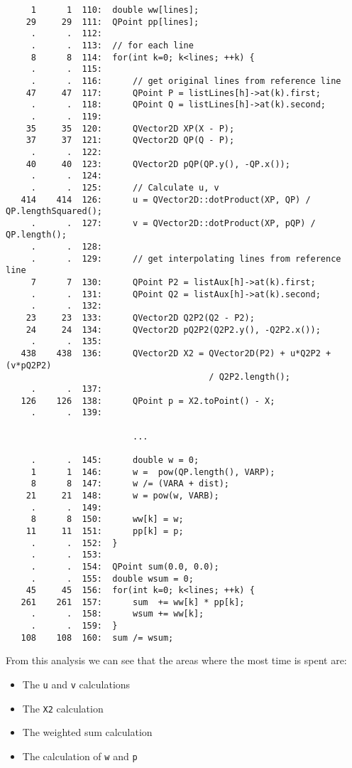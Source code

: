 \documentclass[12pt]{article}
\begin{document}
\begin{lstlisting}
     1      1  110:  double ww[lines];
    29     29  111:  QPoint pp[lines];
     .      .  112:
     .      .  113:  // for each line
     8      8  114:  for(int k=0; k<lines; ++k) {
     .      .  115:
     .      .  116:      // get original lines from reference line
    47     47  117:      QPoint P = listLines[h]->at(k).first;
     .      .  118:      QPoint Q = listLines[h]->at(k).second;
     .      .  119:
    35     35  120:      QVector2D XP(X - P);
    37     37  121:      QVector2D QP(Q - P);
     .      .  122:
    40     40  123:      QVector2D pQP(QP.y(), -QP.x());
     .      .  124:
     .      .  125:      // Calculate u, v
   414    414  126:      u = QVector2D::dotProduct(XP, QP) /  QP.lengthSquared();
     .      .  127:      v = QVector2D::dotProduct(XP, pQP) / QP.length();
     .      .  128:
     .      .  129:      // get interpolating lines from reference line
     7      7  130:      QPoint P2 = listAux[h]->at(k).first;
     .      .  131:      QPoint Q2 = listAux[h]->at(k).second;
     .      .  132:
    23     23  133:      QVector2D Q2P2(Q2 - P2);
    24     24  134:      QVector2D pQ2P2(Q2P2.y(), -Q2P2.x());
     .      .  135:
   438    438  136:      QVector2D X2 = QVector2D(P2) + u*Q2P2 + (v*pQ2P2)
                                        / Q2P2.length();
     .      .  137:
   126    126  138:      QPoint p = X2.toPoint() - X;
     .      .  139:

                         ...

     .      .  145:      double w = 0;
     1      1  146:      w =  pow(QP.length(), VARP);
     8      8  147:      w /= (VARA + dist);
    21     21  148:      w = pow(w, VARB);
     .      .  149:
     8      8  150:      ww[k] = w;
    11     11  151:      pp[k] = p;
     .      .  152:  }
     .      .  153:
     .      .  154:  QPoint sum(0.0, 0.0);
     .      .  155:  double wsum = 0;
    45     45  156:  for(int k=0; k<lines; ++k) {
   261    261  157:      sum  += ww[k] * pp[k];
     .      .  158:      wsum += ww[k];
     .      .  159:  }
   108    108  160:  sum /= wsum;
\end{lstlisting}

From this analysis we can see that the areas where the most time is spent are:


\begin{itemize}
  \item The \texttt{u} and \texttt{v} calculations
  \item The \texttt{X2} calculation
  \item The weighted sum calculation
  \item The calculation of \texttt{w} and \texttt{p}
\end{itemize}
\end{document}
